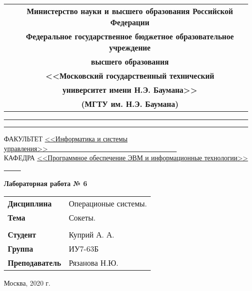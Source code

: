 \pagestyle{empty}
    \begin{table}[H]
        \centering
        \footnotesize
        \begin{tabular}{cc}
            & \textbf{Министерство науки и высшего образования Российской Федерации} \\
            & \textbf{Федеральное государственное бюджетное образовательное учреждение} \\
            & \textbf{высшего образования} \\
            & \textbf{<<Московский государственный технический} \\
            & \textbf{университет имени Н.Э. Баумана>>} \\
            & \textbf{(МГТУ им. Н.Э. Баумана)} \\
        \end{tabular}
    \end{table}

    \vspace{-2.5cm}

    \begin{flushleft}
        \rule[-1cm]{\textwidth}{3pt}
        \rule{\textwidth}{1pt}
    \end{flushleft}

    \begin{flushleft}
        \small
        ФАКУЛЬТЕТ
        \underline{<<Информатика и системы управления>>\ \ \ \ \ \ \ 
        \ \ \ \ \ \ \ \ \ \ \ \ \ \ \ \ \ \ \ \ \ \ \ \ \ \ \ \ \ \ \  } \\
        КАФЕДРА
        \underline{<<Программное обеспечение ЭВМ и
        информационные технологии>>
        \ \ \ \ \ }
    \end{flushleft}

    \vspace{1cm}

    \begin{center}
        \textbf{Лабораторная работа № 6} \\
        \vspace{0.5cm}
    \end{center}

    \vspace{4cm}

    \begin{flushleft}
        \begin{tabular}{ll}
            \textbf{Дисциплина} & Операционые системы. \\
            \textbf{Тема} & Сокеты. \\
            \\
            \textbf{Студент} & Куприй А. А. \\
            \textbf{Группа} & ИУ7-63Б \\
            \textbf{Преподаватель} & Рязанова Н.Ю. \\
        \end{tabular}
    \end{flushleft}

    \vspace{6cm}

    \begin{center}
        Москва, 2020 г.
    \end{center}
